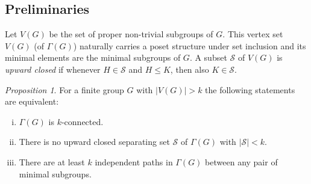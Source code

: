 \documentclass[a4paper,12pt]{article}
\theoremstyle{definition}
\theoremstyle{remark}
\theoremstyle{theorem}
\newtheorem{prop}[theorem]{Proposition}
\begin{document}
\subsection*{Preliminaries}


Let $V(G)$ be the set of proper non-trivial subgroups of $G$. This vertex set $V(G)$ (of $\Gamma(G)$) naturally carries a poset structure under set inclusion and its minimal elements are the minimal subgroups of $G$. A subset $\mathcal{S}$ of $V(G)$ is \emph{upward closed} if whenever $H\in \mathcal{S}$ and $H\leq K$, then also $K\in\mathcal{S}$.

\begin{prop}\label{prop:upward}
  For a finite group $G$ with $|V(G)|>k$ the following statements are
  equivalent:
  \begin{enumerate}[(i)]
  \item $\Gamma(G)$ is $k$-connected.
  \item There is no upward closed separating set $\mathcal{S}$ of
    $\Gamma(G)$ with $|\mathcal{S}|<k$.
  \item There are at least $k$ independent paths in $\Gamma(G)$
    between any pair of minimal subgroups.
  \end{enumerate}
\end{prop}
\end{document}
